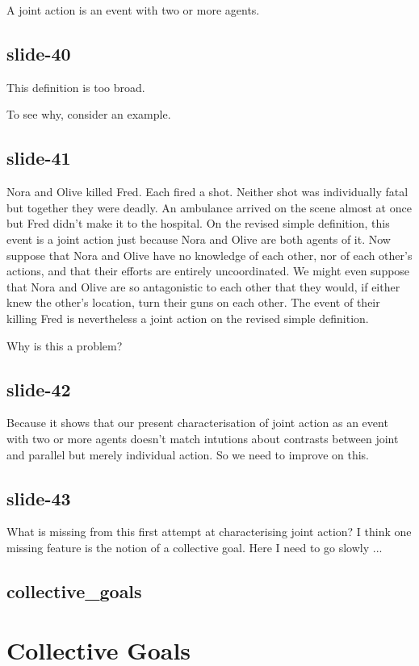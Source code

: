 \documentclass[12pt,\papersize]{extarticle}
\begin{document}
A joint action is an event with two or more agents.\citep{ludwig_collective_2007}

\subsection{slide-40}
This definition is too broad.

To see why, consider an example.

\subsection{slide-41}
Nora and Olive killed Fred.
Each fired a shot.
Neither shot was individually fatal but together they were deadly.
An ambulance arrived on the scene almost at once but Fred didn't make it to the hospital.
On the revised simple definition, this event is a joint action just because Nora and
Olive are both agents of it.
Now suppose that Nora and Olive have no knowledge of each other, nor of each other's
actions, and that their efforts are entirely uncoordinated.
We might even suppose that Nora and Olive are so antagonistic to each other that they
would, if either knew the other's location, turn their guns on each other.
The event of their killing Fred is nevertheless a joint action on the revised simple definition.

Why is this a problem?

\subsection{slide-42}
Because it shows that our present characterisation of joint action as an event
with two or more agents doesn't match intutions about contrasts between joint and
parallel but merely individual action.
So we need to improve on this.

\subsection{slide-43}
What is missing from this first attempt at characterising joint action?
I think one missing feature is the notion of a collective goal.
Here I need to go slowly ...

\subsection{collective\_goals}


\section{Collective Goals}
\end{document}
